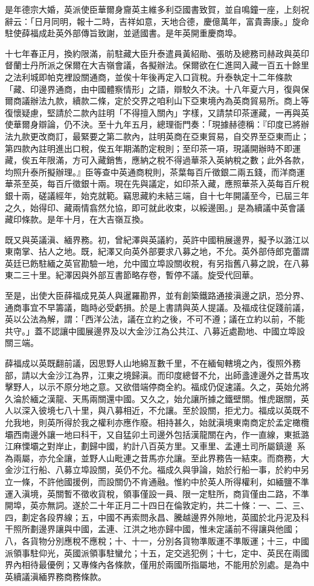 \begin{pinyinscope}
是年德宗大婚，英派使臣華爾身齎英主維多利亞國書致賀，並自鳴鐘一座，上刻祝辭云：「日月同明，報十二時，吉祥如意，天地合德，慶億萬年，富貴壽康。」旋命駐使薛福成赴英外部傳旨致謝，並遞國書。是年英開重慶商埠。

十七年春正月，換約限滿，前駐藏大臣升泰遣員黃紹勛、張昉及總務司赫政與英印督蘭士丹所派之保爾在大吉嶺會議，各擬辦法。保爾欲在仁進岡入藏一百五十餘里之法利城即帕克裡設關通商，並俟十年後再定入口貨稅。升泰執定十二年條款「藏、印邊界通商，由中國體察情形」之語，辯駮久不決。十八年夏六月，復與保爾商議辦法九款，續款二條，定於交界之咱利山下亞東境內為英商貿易所。商上等復懷疑慮，堅請於二款內註明「不得擅入關內」字樣，又請禁印茶運藏，一再與英使華爾身辯論，仍不決。至十九年五月，總理衙門奏：「現據赫德稱：『印度已將辦法九款更改商訂，最緊要之第二款內，註明英商在亞東貿易，自交界至亞東而止；第四款內註明進出口稅，俟五年期滿酌定稅則；至印茶一項，現議開辦時不即運藏，俟五年限滿，方可入藏銷售，應納之稅不得過華茶入英納稅之數；此外各款，均照升泰所擬辦理。』臣等查中英通商稅則，茶葉每百斤徵銀二兩五錢，而洋商運華茶至英，每百斤徵銀十兩。現在先與議定，如印茶入藏，應照華茶入英每百斤稅銀十兩，磋議經年，始克就範。竊思藏約未結三端，自十七年開議至今，已屆三年之久，始得印、藏兩情翕然允協，即可就此收束，以綏邊圉。」是為續議中英會議藏印條款。是年十月，在大吉嶺互換。

既又與英議滇、緬界務。初，曾紀澤與英議約，英許中國稍展邊界，擬予以潞江以東南掌、拈人之地。既，紀澤又向英外部要求八募之地，不允。英外部侍郎克蕾謂英廷已飭駐緬之英官勘驗一地，允中國立埠設關收稅，有另指舊八募之說，在八募東二三十里。紀澤因與外部互書節略存卷，暫停不議。旋受代回華。

至是，出使大臣薛福成見英人與暹羅勘界，並有創築鐵路通接滇邊之訊，恐分界、通商事宜不早籌議，臨時必受虧損。於是上書請與英人提議。及福成往促踐前議，英以公法為解，謂：「西洋公法，議在立約之後，不可不遵；議在立約以前，不能共守。」蓋不認讓中國展邊界及以大金沙江為公共江、八募近處勘地、中國立埠設關三端。

薛福成以英既翻前議，因思野人山地綿亙數千里，不在緬甸轄境之內，復照外務部，請以大金沙江為界，江東之境歸滇。而印度總督不允，出師盞達邊外之昔馬攻擊野人，以示不原分地之意。又欲借端停商全約。福成仍促速議。久之，英始允將久淪於緬之漢龍、天馬兩關還中國。又久之，始允讓所據之鐵壁關。惟虎踞關，英人以深入彼境七八十里，與八募相近，不允讓。至於設關，拒尤力。福成以英既不允我地，則英所得於我之權利亦應作廢。相持甚久，始就滇境東南商定於孟定橄欖壩西南邊外讓一地曰科干，又自猛卯土司邊外包括漢龍關在內，作一直線，東抵潞江麻慄壩之對岸止，劃歸中國，約計八百英方里。又車里、孟連土司所屬鎮邊，系為兩屬，亦允全讓，並野人山毗連之昔馬亦允讓。至此界務告一結束。而商務，大金沙江行船、八募立埠設關，英仍不允。福成久與爭論，始於行船一事，於約中另立一條，不許他國援例，而設關仍不肯通融。惟約中於英人所得權利，如緬鹽不準運入滇境，英關暫不徵收貨稅，領事僅設一員、限一定駐所，商貨僅由二路，不準開埠，英亦無詞。遂於二十年正月二十四日在倫敦定約，共二十條：一、二、三、四，劃定各段界線；五，中國不再索問永昌、騰越邊界外隙地，英國於北丹泥及科干照所劃邊界讓與中國，孟連、江洪之地亦歸中國，惟未定議前不得讓與他國；八，各貨物分別應稅不應稅；十、十一，分別各貨物準販運不準販運；十三，中國派領事駐仰光，英國派領事駐蠻允；十五，定交逃犯例；十七，定中、英民在兩國界內相待最優例；又專條內各條款，僅用於兩國所指屬地，不能用於別處。是為中英續議滇緬界務商務條款。


\end{pinyinscope}
